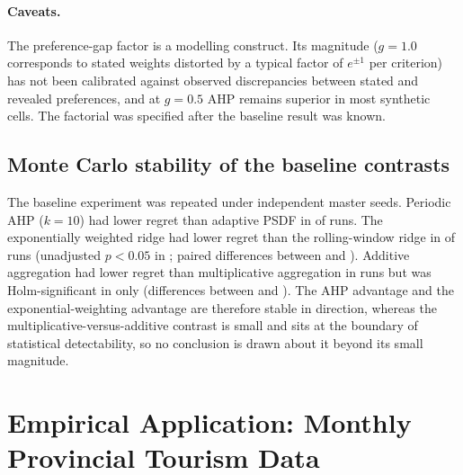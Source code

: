 \documentclass[12pt,a4paper]{article}
\begin{document}
\paragraph{Caveats.} The preference-gap factor is a modelling construct. Its magnitude ($g=1.0$ corresponds to stated weights distorted by a typical factor of $e^{\pm1}$ per criterion) has not been calibrated against observed discrepancies between stated and revealed preferences, and at $g=0.5$ AHP remains superior in most synthetic cells. The factorial was specified after the baseline result was known.

\subsection{Monte Carlo stability of the baseline contrasts}\label{sec:stability}
The baseline experiment was repeated under \RobSeeds{} independent master seeds. Periodic AHP ($k=10$) had lower regret than adaptive PSDF in \RobAHPTenAllNeg{} of \RobSeeds{} runs. The exponentially weighted ridge had lower regret than the rolling-window ridge in \RobEWLower{} of \RobSeeds{} runs (unadjusted $p<0.05$ in \RobEWSig; paired differences between \RobEWMin{} and \RobEWMax{}). Additive aggregation had lower regret than multiplicative aggregation in \RobAddLower{} runs but was Holm-significant in only \RobAddSig{} (differences between \RobAddMin{} and \RobAddMax{}). The AHP advantage and the exponential-weighting advantage are therefore stable in direction, whereas the multiplicative-versus-additive contrast is small and sits at the boundary of statistical detectability, so no conclusion is drawn about it beyond its small magnitude.

\section{Empirical Application: Monthly Provincial Tourism Data}\label{sec:empirical}
\end{document}
